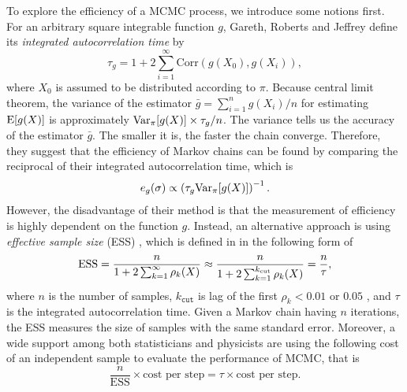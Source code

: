 To explore the efficiency of a MCMC process, we introduce some notions first. For an arbitrary square integrable function $g$, Gareth, Roberts and Jeffrey \cite{roberts2001optimal} define its \textit{integrated autocorrelation time} by 
\begin{equation*}
\tau_g = 1+ 2\sum_{i=1}^{\infty} \mathrm{Corr}\left( g(X_0),g(X_i) \right),
\end{equation*}
where $X_0$ is assumed to be distributed according to $\pi$. Because central limit theorem, the variance of the estimator $\bar{g} = \sum_{i=1}^{n}g(X_i)/n$ for estimating $\mathrm{E}\lbrack g(X) \rbrack$ is approximately $\mathrm{Var}_\pi\lbrack g(X)\rbrack \times \tau_g/n$. The variance tells us the accuracy of the estimator $\bar{g}$. The smaller it is, the faster the chain converge. Therefore, they suggest that the efficiency of Markov chains can be found by comparing the reciprocal of their integrated autocorrelation time, which is 
\begin{equation*}
e_g(\sigma)\propto \left(\tau_g\mathrm{Var}_\pi\lbrack g(X)\rbrack \right)^{-1}. 
\end{equation*}
However, the disadvantage of their method is that the measurement of efficiency is highly dependent on the function $g$. Instead, an alternative approach is using \textit{effective sample size} (ESS) \cite{kass1998markov} \cite{robert2004monte},  which is defined in \cite{gong2016practical} in the following form of  
\begin{equation*}
\mbox{ESS} =  \frac{n}{1+2\sum_{k=1}^{\infty}\rho_k(X)} \approx \frac{n}{1+2\sum_{k=1}^{k_\text{\tiny cut}}\rho_k(X)}= \frac{n}{\tau}, 
\end{equation*}
where $n$ is the number of samples, $k_\mathtt{cut}$ is lag of the first $\rho_k<0.01$  or $0.05$ , and $\tau$ is the integrated autocorrelation time. Given a Markov chain having $n$ iterations, the ESS measures the size of \iid samples with the same standard error. Moreover, a wide support among both statisticians \cite{geyer1992practical} and physicists \cite{sokal1997monte} are using the following cost of an independent sample to evaluate the performance of MCMC, that is 
\begin{equation*}
\frac{n}{\mbox{ESS}}\times \mbox{cost per step} = \tau \times  \mbox{cost per step}.
\end{equation*} 

